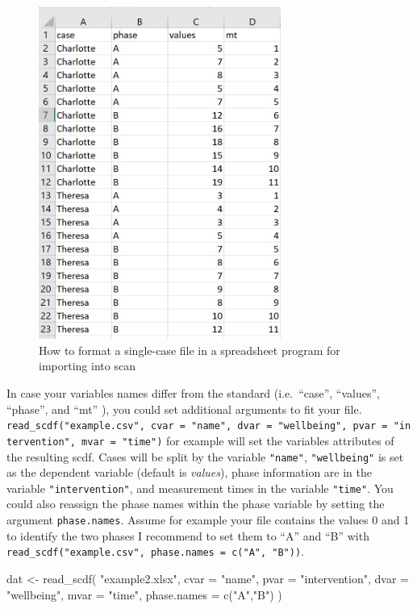 \documentclass[
]{book}
\newenvironment{Shaded}{\begin{snugshade}}{\end{snugshade}}
\newcommand{\AttributeTok}[1]{\textcolor[rgb]{0.77,0.63,0.00}{#1}}
\newcommand{\FunctionTok}[1]{\textcolor[rgb]{0.00,0.00,0.00}{#1}}
\newcommand{\NormalTok}[1]{#1}
\newcommand{\OtherTok}[1]{\textcolor[rgb]{0.56,0.35,0.01}{#1}}
\newcommand{\StringTok}[1]{\textcolor[rgb]{0.31,0.60,0.02}{#1}}
\begin{document}
\begin{figure}
\centering
\includegraphics[width=3.125in,height=\textheight]{images/readSC.jpg}
\caption{How to format a single-case file in a spreadsheet program for importing into scan}
\end{figure}

In case your variables names differ from the standard (i.e.~``case'', ``values'', ``phase'', and ``mt'' ), you could set additional arguments to fit your file. \texttt{read\_scdf("example.csv",\ cvar\ =\ "name",\ dvar\ =\ "wellbeing",\ pvar\ =\ "intervention",\ mvar\ =\ "time")} for example will set the variables attributes of the resulting scdf. Cases will be split by the variable \texttt{"name"}, \texttt{"wellbeing"} is set as the dependent variable (default is \emph{values}), phase information are in the variable \texttt{"intervention"}, and measurement times in the variable \texttt{"time"}. You could also reassign the phase names within the phase variable by setting the argument \texttt{phase.names}. Assume for example your file contains the values 0 and 1 to identify the two phases I recommend to set them to ``A'' and ``B'' with \texttt{read\_scdf("example.csv",\ phase.names\ =\ c("A",\ "B"))}.

\begin{Shaded}
\begin{Highlighting}[]
\NormalTok{dat }\OtherTok{\textless{}{-}} \FunctionTok{read\_scdf}\NormalTok{(}
  \StringTok{"example2.xlsx"}\NormalTok{, }\AttributeTok{cvar =} \StringTok{"name"}\NormalTok{, }\AttributeTok{pvar =} \StringTok{"intervention"}\NormalTok{, }
  \AttributeTok{dvar =} \StringTok{"wellbeing"}\NormalTok{, }\AttributeTok{mvar =} \StringTok{"time"}\NormalTok{, }\AttributeTok{phase.names =} \FunctionTok{c}\NormalTok{(}\StringTok{"A"}\NormalTok{,}\StringTok{"B"}\NormalTok{)}
\NormalTok{)}
\end{Highlighting}
\end{Shaded}
\end{document}
